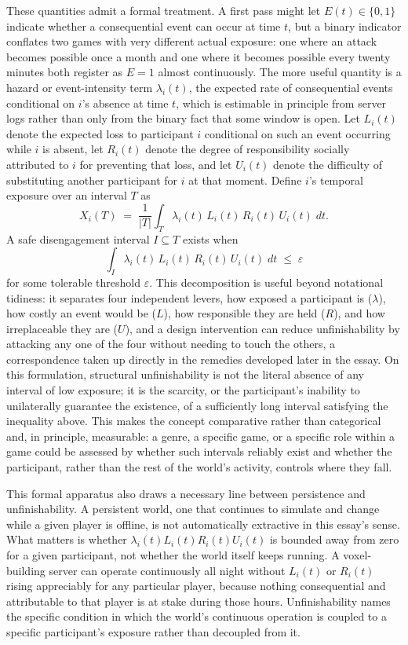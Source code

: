 \documentclass[11pt]{article}
\begin{document}
These quantities admit a formal treatment. A first pass might let $E(t) \in \{0,1\}$ indicate whether a consequential event can occur at time $t$, but a binary indicator conflates two games with very different actual exposure: one where an attack becomes possible once a month and one where it becomes possible every twenty minutes both register as $E=1$ almost continuously. The more useful quantity is a hazard or event-intensity term $\lambda_i(t)$, the expected rate of consequential events conditional on $i$'s absence at time $t$, which is estimable in principle from server logs rather than only from the binary fact that some window is open. Let $L_i(t)$ denote the expected loss to participant $i$ conditional on such an event occurring while $i$ is absent, let $R_i(t)$ denote the degree of responsibility socially attributed to $i$ for preventing that loss, and let $U_i(t)$ denote the difficulty of substituting another participant for $i$ at that moment. Define $i$'s temporal exposure over an interval $T$ as
\[
X_i(T) \;=\; \frac{1}{|T|} \int_T \lambda_i(t)\,L_i(t)\,R_i(t)\,U_i(t) \; dt.
\]
A safe disengagement interval $I \subseteq T$ exists when
\[
\int_I \lambda_i(t)\,L_i(t)\,R_i(t)\,U_i(t) \; dt \;\le\; \varepsilon
\]
for some tolerable threshold $\varepsilon$. This decomposition is useful beyond notational tidiness: it separates four independent levers, how exposed a participant is ($\lambda$), how costly an event would be ($L$), how responsible they are held ($R$), and how irreplaceable they are ($U$), and a design intervention can reduce unfinishability by attacking any one of the four without needing to touch the others, a correspondence taken up directly in the remedies developed later in the essay. On this formulation, structural unfinishability is not the literal absence of any interval of low exposure; it is the scarcity, or the participant's inability to unilaterally guarantee the existence, of a sufficiently long interval satisfying the inequality above. This makes the concept comparative rather than categorical and, in principle, measurable: a genre, a specific game, or a specific role within a game could be assessed by whether such intervals reliably exist and whether the participant, rather than the rest of the world's activity, controls where they fall.

This formal apparatus also draws a necessary line between persistence and unfinishability. A persistent world, one that continues to simulate and change while a given player is offline, is not automatically extractive in this essay's sense. What matters is whether $\lambda_i(t)L_i(t)R_i(t)U_i(t)$ is bounded away from zero for a given participant, not whether the world itself keeps running. A voxel-building server can operate continuously all night without $L_i(t)$ or $R_i(t)$ rising appreciably for any particular player, because nothing consequential and attributable to that player is at stake during those hours. Unfinishability names the specific condition in which the world's continuous operation is coupled to a specific participant's exposure rather than decoupled from it.
\end{document}
